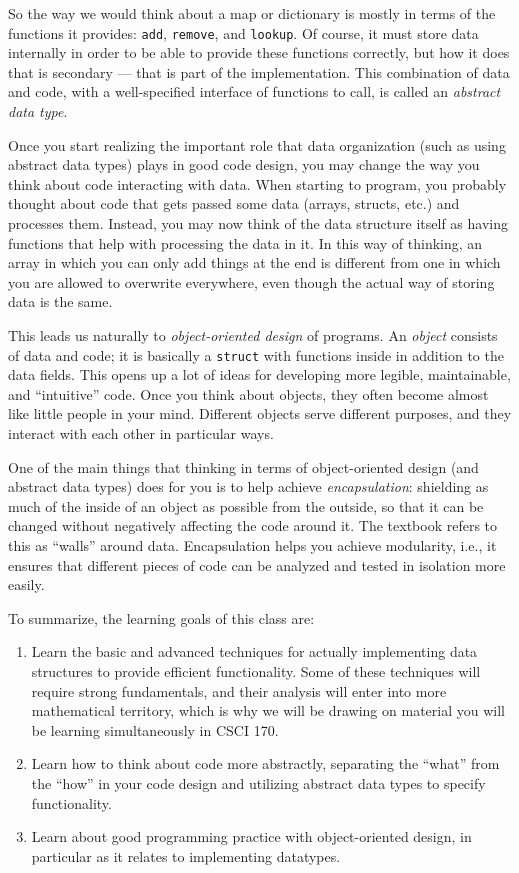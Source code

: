 So the way we would think about a map or dictionary is mostly in terms
of the functions it provides:
\texttt{add}, \texttt{remove}, and \texttt{lookup}.
Of course, it must store data internally in order to be
able to provide these functions correctly, but how it does that is
secondary --- that is part of the implementation.
This combination of data and code, with a well-specified interface of
functions to call, is called an \emph{abstract data type}.

Once you start realizing the important role that data organization
(such as using abstract data types) plays in good code design,
you may change the way you think about code interacting with data.
When starting to program, you probably thought about code that gets
passed some data (arrays, structs, etc.) and processes them.
Instead, you may now think of the data structure itself as having functions
that help with processing the data in it. 
In this way of thinking, an array in which you can only add things at
the end is different from one in which you are allowed to overwrite
everywhere, even though the actual way of storing data is the same.

This leads us naturally to \emph{object-oriented design} of programs. 
An \emph{object} consists of data and code; it is basically a
\texttt{struct} with functions inside in addition to the data fields. 
This opens up a lot of ideas for developing more legible,
maintainable, and ``intuitive'' code.
Once you think about objects, they often become almost like little
people in your mind.
Different objects serve different purposes,
and they interact with each other in particular ways.

One of the main things that thinking in terms of object-oriented
design (and abstract data types) does for you is to help achieve 
\emph{encapsulation}: shielding as much of the inside of an object as
possible from the outside, so that it can be changed without
negatively affecting the code around it.
The textbook refers to this as ``walls'' around data.
Encapsulation helps you achieve modularity, i.e., it ensures that
different pieces of code can be analyzed and tested in isolation more 
easily.

\medskip

To summarize, the learning goals of this class are:
\begin{enumerate}
\item Learn the basic and advanced techniques for actually
  implementing data structures to provide efficient functionality.
  Some of these techniques will require strong fundamentals,
  and their analysis will enter into more mathematical territory,
  which is why we will be drawing on material you will be learning
  simultaneously in CSCI 170.
\item Learn how to think about code more abstractly, separating the
  ``what'' from the ``how'' in your code design and utilizing abstract
  data types to specify functionality.
\item Learn about good programming practice with object-oriented
  design, in particular as it relates to implementing datatypes.
\end{enumerate}
